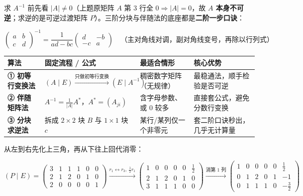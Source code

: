 \documentclass[10pt,a4paper]{ctexart}
\begin{document}

求 $A^{-1}$ 前先看 $|A|\ne 0$（上题原矩阵 $A$ 第 $3$ 行全 $0\Rightarrow|A|=0$，故 \textbf{$A$ 本身不可逆}；求逆的是可逆过渡矩阵 $P$）。三阶分块与伴随法的底座都是\textbf{二阶一步口诀}：

\[
\begin{pmatrix}a&b\\c&d\end{pmatrix}^{-1}=\frac{1}{ad-bc}\begin{pmatrix}d&-b\\-c&a\end{pmatrix}\quad\text{（主对角线对调，副对角线变号，再除以行列式）}
\]


\begin{center}\small
\begin{tabularx}{\linewidth}{@{}>{\raggedright\arraybackslash}X>{\raggedright\arraybackslash}X>{\raggedright\arraybackslash}X>{\raggedright\arraybackslash}X@{}}
\toprule
算法 & 固定流程 / 公式 & 最适合情形 & 核心优势 \\
\midrule
\textbf{① 初等行变换法} & $(A\mid E)\xrightarrow{\text{只做初等行变换}}(E\mid A^{-1})$ & 稠密数字矩阵（无规律） & 最稳通法，顺手检验是否可逆 \\
\textbf{② 伴随矩阵法} & $A^{-1}=\frac{1}{\lvert A\rvert}A^*$，$A^*=(A_{ji})$ & 含字母参数、或 $0$ 较多 & 直接套公式，避免分数行变换 \\
\textbf{③ 分块求逆法} & 拆成 $2\times 2$ 块 $B$ 与 $1\times 1$ 块 $c$ & 某行/某列仅一个非零元 & 套二阶口诀秒出，几乎无计算量 \\
\bottomrule
\end{tabularx}
\end{center}


从左到右先化上三角，再从下往上回代消零：

\[
(P\mid E)=\left(\begin{array}{ccc|ccc}3&1&1&1&0&0\\2&1&2&0&1&0\\2&0&0&0&0&1\end{array}\right)\xrightarrow{r_1\leftrightarrow r_3,\ \frac{1}{2}r_1}\left(\begin{array}{ccc|ccc}1&0&0&0&0&\frac{1}{2}\\2&1&2&0&1&0\\3&1&1&1&0&0\end{array}\right)\xrightarrow{\text{消第 }1\text{ 列}}\left(\begin{array}{ccc|ccc}1&0&0&0&0&\frac{1}{2}\\0&1&2&0&1&-1\\0&1&1&1&0&-\frac{3}{2}\end{array}\right)
\]
\end{document}
